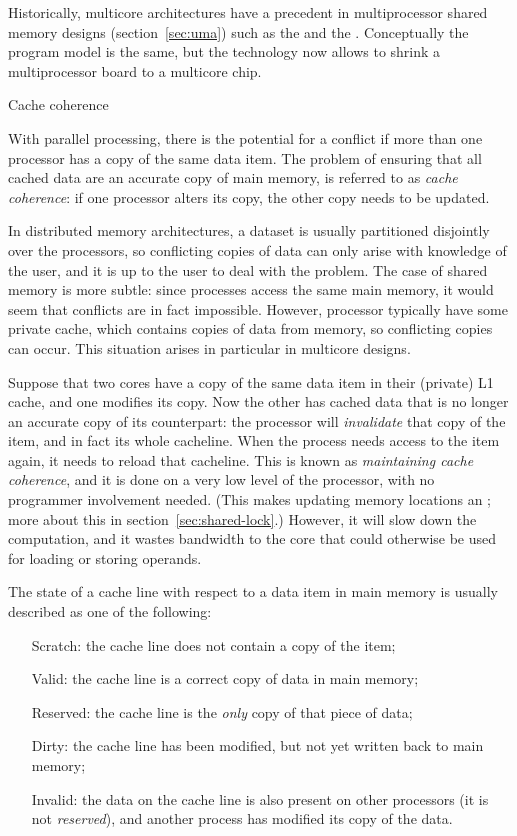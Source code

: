 Historically, multicore architectures have a precedent in
multiprocessor shared memory designs (section~\ref{sec:uma}) such as
the  and the . Conceptually the program model is the same, but the
technology now allows to shrink a multiprocessor board to a multicore
chip.

 {Cache coherence}
\label{sec:coherence}

With parallel processing, there is the potential for a conflict if more
than one processor has a copy of the same data item. The problem of
ensuring that all cached data are an accurate copy of main memory, is
referred to as \emph{cache coherence}: if one processor alters
its copy, the other copy needs to be updated.

In distributed memory architectures, a dataset is usually partitioned
disjointly over the processors, so conflicting copies of data can only
arise with knowledge of the user, and it is up to the user to
deal with the problem. The case of shared memory is more subtle: since
processes access the same main memory, it would seem that conflicts
are in fact impossible. However, processor typically have some private
cache, which contains copies of data from memory, so conflicting
copies can occur.  This situation arises in particular in multicore
designs.

Suppose that
two cores have a copy of the same data item in their (private) L1
cache, and one modifies its copy. Now the other has cached data that is no
longer an accurate copy of its counterpart: the processor will
\emph{invalidate} that copy of the item,
and in fact its whole cacheline. When the process needs access to the
item again, it needs to reload that cacheline.
This is known as \emph{maintaining
  cache coherence}, and it is done on a very low level of the
processor, with no programmer involvement needed. (This makes updating
memory locations an ; more about this in section~\ref{sec:shared-lock}.)
However, it will slow down the computation,
and it wastes bandwidth to the core that could otherwise be used for
loading or storing operands.

The state of a cache line with respect to a data item in main memory
is usually described as one of the following:
\begin{itemize}
\item[Scratch:] the cache line does not contain a copy of the item;
\item[Valid:] the cache line is a correct copy of data in main memory;
\item[Reserved:] the cache line is the \emph{only} copy of that piece
  of data;
\item[Dirty:] the cache line has been modified, but not yet written
  back to main memory;
\item [Invalid:] the data on the cache line is also present on other
  processors (it is not \emph{reserved}), and another process has
  modified its copy of the data.
\end{itemize}


